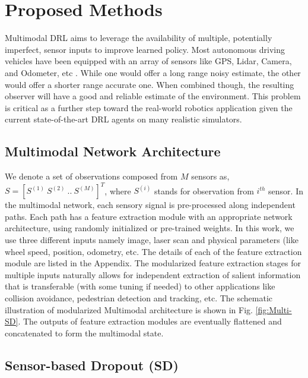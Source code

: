 \documentclass[../thesis.tex]{subfiles}
\begin{document}
 
\section{Proposed Methods} \label{sec:mdrl-proposed}
 
Multimodal DRL aims to leverage the availability of multiple, potentially imperfect, sensor inputs to improve learned policy. Most autonomous driving vehicles have been equipped with an array of sensors like GPS, Lidar, Camera, and Odometer, etc \cite{hudda2013self}. While one would offer a long range noisy estimate, the other would offer a shorter range accurate one. When combined though, the resulting observer will have a good and reliable estimate of the environment. This problem is critical as a further step toward the real-world robotics application given the current state-of-the-art DRL agents on many realistic simulators.
 
 
\subsection{Multimodal Network Architecture}
 
 
We denote a set of observations composed from $M$ sensors as, $S = [S^{(1)}~S^{(2)}~..~S^{(M)}]^T$, where $S^{(i)}$ stands for observation from $i^{th}$ sensor. In the multimodal network, each sensory signal is pre-processed along independent paths. Each path has a feature extraction module with an appropriate network architecture, using randomly initialized or pre-trained weights. In this work, we use three different inputs namely image, laser scan and physical parameters (like wheel speed, position, odometry, etc. The details of each of the feature extraction module are listed in the Appendix. The modularized feature extraction stages for multiple inputs naturally allows for independent extraction of salient information that is transferable (with some tuning if needed) to other applications like collision avoidance, pedestrian detection and tracking, etc. The schematic illustration of modularized Multimodal architecture is shown in Fig. \ref{fig:Multi-SD}. The outputs of feature extraction modules are eventually flattened and concatenated to form the multimodal state.
 
\subsection{Sensor-based Dropout (SD)} \label{sec:SD}
 
\end{document}
